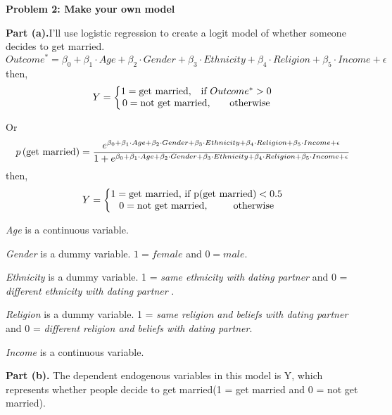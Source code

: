 \documentclass[letterpaper,12pt]{article}
\theoremstyle{definition}
\begin{document}
\noindent\textbf{Problem 2: Make your own model}

\textbf{Part (a).}I'll use logistic regression to create a logit model of whether someone decides to get married. 
\begin{equation*}
Outcome^{*}=\beta _{0} + \beta _{1}\cdot Age + \beta _{2}\cdot Gender + \beta _{3}\cdot Ethnicity + \beta _{4}\cdot Religion +  \beta _{5}\cdot Income + \epsilon
\end{equation*}
then,
\begin{equation*}
Y = \left\{\begin{matrix}
1=\textup{get married,} \quad\textup{if } Outcome^{*}> 0 \\ 0=\textup{not get married,}\qquad\textup{otherwise} 
\end{matrix}\right.
\end{equation*}

Or
\begin{equation*}
p\left ( \textup{get married} \right )=\frac{e^{\beta _{0} + \beta _{1}\cdot Age + \beta _{2}\cdot Gender + \beta _{3}\cdot Ethnicity + \beta _{4}\cdot Religion +  \beta _{5}\cdot Income + \epsilon}}{1+e^{\beta _{0} + \beta _{1}\cdot Age + \beta _{2}\cdot Gender + \beta _{3}\cdot Ethnicity + \beta _{4}\cdot Religion +  \beta _{5}\cdot Income + \epsilon}}
\end{equation*}
then,
\begin{equation*}
Y = \left\{\begin{matrix}
1=\textup{get married,} \ \textup{if p(get married)} < 0.5 \\ 0=\textup{not get married,}\ \qquad \textup{ otherwise}
\end{matrix}\right.
\end{equation*}

\emph{Age} is a continuous variable. 

\emph{Gender} is a dummy variable. $1 = female$ and $0 = male$.  

\emph{Ethnicity } is a dummy variable.  1 = \emph{same ethnicity with dating partner} and  0 = \emph{different ethnicity with dating partner }. 

\emph{Religion} is a dummy variable.  1 = \emph{same religion and beliefs with dating partner} and 0 = \emph{different religion and beliefs with dating partner}. 

\emph{Income} is a continuous variable.

\textbf{Part (b).} The dependent endogenous variables in this model is Y, which represents whether people decide to get married(1 = get married and 0 = not get married).
\end{document}
